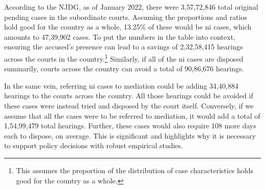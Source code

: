According to the NJDG, as of January 2022, there were 3,57,72,846 total original pending cases in the subordinate courts. Assuming the proportions and ratios hold good for the country as a whole, 13.25\% of these would be \gls{ni} cases, which amounts to 47,39,902 cases. To put the numbers in the table into context, ensuring the accused's presence can lead to a savings of 2,32,58,415 hearings across the courts in the country.\footnote{This assumes the proportion of the distribution of case characteristics holds good for the country as a whole.} Similarly, if all of the \gls{ni} cases are disposed summarily, courts across the country can avoid a total of 90,86,676 hearings.

In the same vein, referring \gls{ni} cases to mediation could be adding 34,40,884 hearings to the courts across the country. All those hearings could be avoided if these cases were instead tried and disposed by the court itself. Conversely, if we assume that all the cases were to be referred to mediation, it would add a total of 1,54,99,479 total hearings. Further, these cases would also require 108 more days each to dispose, on average. This is significant and highlights why it is necessary to support policy decisions with robust empirical studies.

